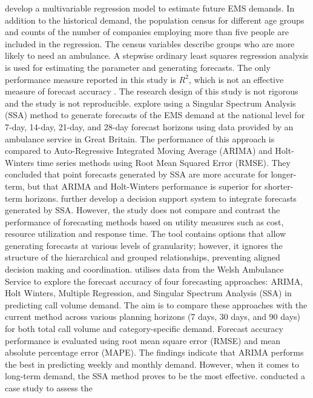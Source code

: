 \documentclass[
  authoryear,
  preprint,
  3p]{elsarticle}
\begin{document}
\citet{sasaki2010using} develop a multivariable regression model to
estimate future EMS demands. In addition to the historical demand, the
population census for different age groups and counts of the number of
companies employing more than five people are included in the
regression. The census variables describe groups who are more likely to
need an ambulance. A stepwise ordinary least squares regression analysis
is used for estimating the parameter and generating forecasts. The only
performance measure reported in this study is \(R^2\), which is not an
effective measure of forecast accuracy \citep[p457]{armstrong01}. The
research design of this study is not rigorous and the study is not
reproducible. \citet{vile2012predicting} explore using a Singular
Spectrum Analysis (SSA) method to generate forecasts of the EMS demand
at the national level for 7-day, 14-day, 21-day, and 28-day forecast
horizons using data provided by an ambulance service in Great Britain.
The performance of this approach is compared to Auto-Regressive
Integrated Moving Average (ARIMA) and Holt-Winters time series methods
using Root Mean Squared Error (RMSE). They concluded that point
forecasts generated by SSA are more accurate for longer-term, but that
ARIMA and Holt-Winters performance is superior for shorter-term
horizons. \citet{vile2016time} further develop a decision support system
to integrate forecasts generated by SSA. However, the study does not
compare and contrast the performance of forecasting methods based on
utility measures such as cost, resource utilization and response time.
The tool contains options that allow generating forecasts at various
levels of granularity; however, it ignores the structure of the
hierarchical and grouped relationships, preventing aligned decision
making and coordination. \citet{al2021empirical} utilises data from the
Welsh Ambulance Service to explore the forecast accuracy of four
forecasting approaches: ARIMA, Holt Winters, Multiple Regression, and
Singular Spectrum Analysis (SSA) in predicting call volume demand. The
aim is to compare these approaches with the current method across
various planning horizons (7 days, 30 days, and 90 days) for both total
call volume and category-specific demand. Forecast accuracy performance
is evaluated using root mean square error (RMSE) and mean absolute
percentage error (MAPE). The findings indicate that ARIMA performs the
best in predicting weekly and monthly demand. However, when it comes to
long-term demand, the SSA method proves to be the most effective.
\citet{ibrahim2016modeling} conducted a case study to assess the
\end{document}
